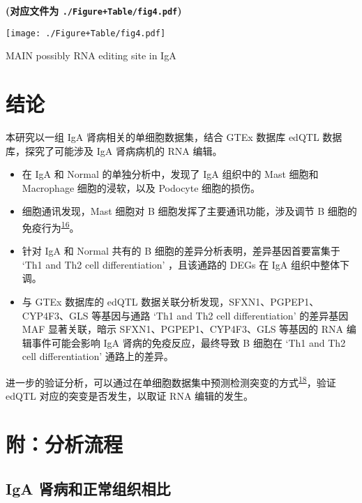 \documentclass[
]{article}
\providecommand{\tightlist}{%
  \setlength{\itemsep}{0pt}\setlength{\parskip}{0pt}}
\begin{document}
\textbf{(对应文件为 \texttt{./Figure+Table/fig4.pdf})}

\def\@captype{figure}
\begin{center}
\texttt{[image: ./Figure+Table/fig4.pdf]}
\caption{MAIN possibly RNA editing site in IgA}\label{fig:MAIN-possibly-RNA-editing-site-in-IgA}
\end{center}

\hypertarget{dis}{%
\section{结论}\label{dis}}

本研究以一组 IgA 肾病相关的单细胞数据集，结合 GTEx 数据库 edQTL 数据库，探究了可能涉及 IgA 肾病病机的 RNA 编辑。

\begin{itemize}
\tightlist
\item
  在 IgA 和 Normal 的单独分析中，发现了 IgA 组织中的 Mast 细胞和 Macrophage 细胞的浸软，以及 Podocyte 细胞的损伤。
\item
  细胞通讯发现，Mast 细胞对 B 细胞发挥了主要通讯功能，涉及调节 B 细胞的免疫行为\textsuperscript{\protect\hyperlink{ref-MastCellModulPalma2021}{16}}。
\item
  针对 IgA 和 Normal 共有的 B 细胞的差异分析表明，差异基因首要富集于 `Th1 and Th2 cell differentiation' ，且该通路的 DEGs 在 IgA 组织中整体下调。
\item
  与 GTEx 数据库的 edQTL 数据关联分析发现，SFXN1、PGPEP1、CYP4F3、GLS 等基因与通路 `Th1 and Th2 cell differentiation' 的差异基因 MAF 显著关联，暗示 SFXN1、PGPEP1、CYP4F3、GLS 等基因的 RNA 编辑事件可能会影响 IgA 肾病的免疫反应，最终导致 B 细胞在 `Th1 and Th2 cell differentiation' 通路上的差异。
\end{itemize}

进一步的验证分析，可以通过在单细胞数据集中预测检测突变的方式\textsuperscript{\protect\hyperlink{ref-DeNovoDetectiMuyas2023}{18}}，验证 edQTL 对应的突变是否发生，以取证 RNA 编辑的发生。

\hypertarget{workflow}{%
\section{附：分析流程}\label{workflow}}

\hypertarget{iga-ux80beux75c5ux548cux6b63ux5e38ux7ec4ux7ec7ux76f8ux6bd4}{%
\subsection{IgA 肾病和正常组织相比}\label{iga-ux80beux75c5ux548cux6b63ux5e38ux7ec4ux7ec7ux76f8ux6bd4}}
\end{document}
